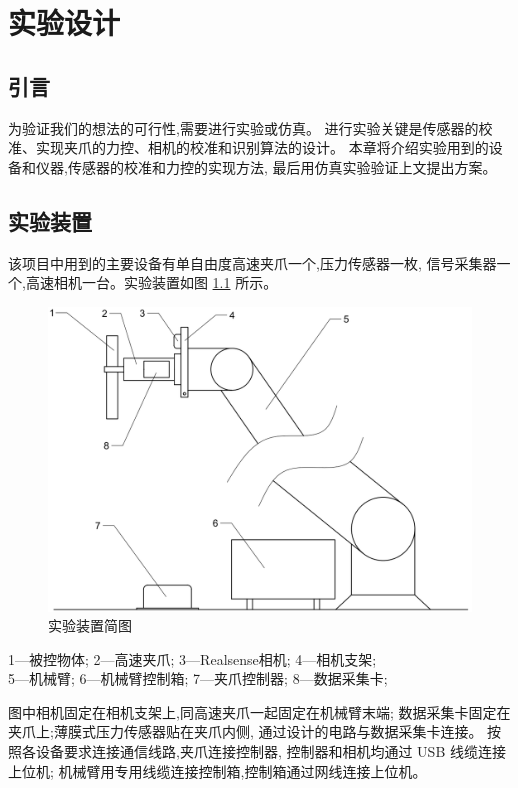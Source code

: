 \chapter{实验设计}

\section{引言}
为验证我们的想法的可行性,需要进行实验或仿真。
进行实验关键是传感器的校准、实现夹爪的力控、相机的校准和识别算法的设计。
本章将介绍实验用到的设备和仪器,传感器的校准和力控的实现方法,
最后用仿真实验验证上文提出方案。

\section{实验装置}
该项目中用到的主要设备有单自由度高速夹爪一个,压力传感器一枚,
信号采集器一个,高速相机一台。实验装置如图 \ref{fig:4-1} 所示。

\begin{figure}[!ht]
  \centering
  \includegraphics[scale=0.4]{chapter04/pic/4-1}
  \caption{实验装置简图}
  \label{fig:4-1}
  \vspace{-0.3cm}
\end{figure}

\vspace{-10pt}
\begin{center}
  1---被控物体; 2---高速夹爪; 3---Realsense相机; 4---相机支架; \\
  5---机械臂; 6---机械臂控制箱; 7---夹爪控制器; 8---数据采集卡;
\end{center}

图中相机固定在相机支架上,同高速夹爪一起固定在机械臂末端;
数据采集卡固定在夹爪上;薄膜式压力传感器贴在夹爪内侧,
通过设计的电路与数据采集卡连接。
按照各设备要求连接通信线路,夹爪连接控制器,
控制器和相机均通过 USB 线缆连接上位机;
机械臂用专用线缆连接控制箱,控制箱通过网线连接上位机。

